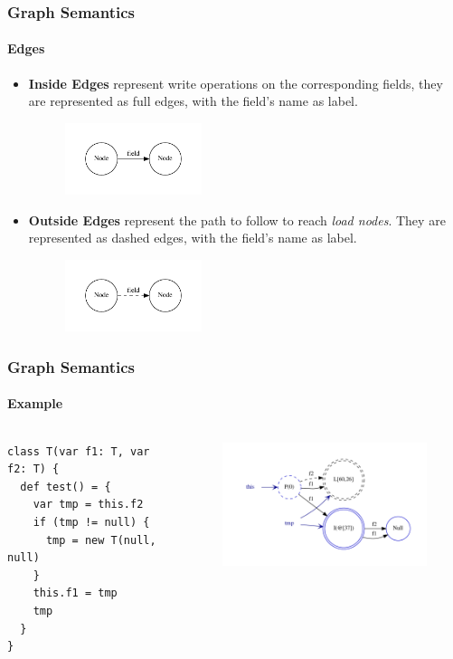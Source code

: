 \documentclass[hyperref={pdfpagelabels=false}]{beamer}
\begin{document}
\begin{frame}
    \frametitle{Graph Semantics}
    \framesubtitle{Edges}

    \begin{itemize}
        \item \textbf{Inside Edges} represent write operations on the
        corresponding fields, they are represented as full edges, with the
        field's name as label.
        \begin{figure}[t]
            \includegraphics[width=40mm]{images/nodes/iedge.pdf}
        \end{figure}

        \item \textbf{Outside Edges} represent the path to follow to reach
        \emph{load nodes}. They are represented as dashed edges, with the
        field's name as label.
        \begin{figure}[t]
            \includegraphics[width=40mm]{images/nodes/oedge.pdf}
        \end{figure}
    \end{itemize}
\end{frame}

\begin{frame}[fragile]
    \frametitle{Graph Semantics}
    \framesubtitle{Example}
    \begin{columns}
      \begin{column}{0.4\textwidth}
\begin{lstlisting}
class T(var f1: T, var f2: T) {
  def test() = {
    var tmp = this.f2
    if (tmp != null) {
      tmp = new T(null, null)
    }
    this.f1 = tmp
    tmp
  }
}
\end{lstlisting}
      \end{column}
      \begin{column}{0.7\textwidth}
        \begin{figure}[t]
            \includegraphics[width=80mm]{images/pt_graph1.pdf}\\
        \end{figure}
      \end{column}
    \end{columns}
\end{frame}
\end{document}
